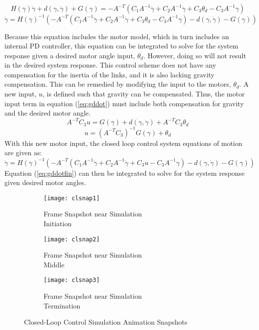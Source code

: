 \[
H(\gamma) \ddot{\gamma}+d(\gamma, \dot{\gamma})+G(\gamma)=-A^{-T}\left(C_1A^{-1} \ddot{\gamma}+C_2 A^{-1} \dot{\gamma}+C_3 \theta_{d}- C_3A^{-1} \gamma\right)
\]
\begin{equation}
\ddot{\gamma}=H(\gamma)^{-1}\left(-A^{-T}\left(C_1 A^{-1} \ddot{\gamma}+C_2 A^{-1} \dot{\gamma}+C_3 \theta_{d}-C_3A^{-1} \gamma\right)-d(\gamma, \dot{\gamma})-G(\gamma)\right)
\label{eq:gddot}
\end{equation}

Because this equation includes the motor model, which in turn includes an internal PD controller, this equation can be integrated to solve for the system response given a desired motor angle input, $\theta_d$. However, doing so will not result in the desired system response. This control scheme does not have any compensation for the inertia of the links, and it is also lacking gravity compensation. This can be remedied by modifying the input to the motors, $\theta_d$. A new input, $u$, is defined such that gravity can be compensated. Thus, the motor input term in equation (\ref{eq:gddot}) must include both compensation for gravity and the desired motor angle.
\[
A^{-T} C_3  u=G(\gamma)+d(\gamma, \dot{\gamma})+A^{-T} C_3\theta_{d}
\]
\begin{equation}
u=\left(A^{-T} C_3\right)^{-1} G(\gamma)+\theta_{d}
\end{equation}
With this new motor input, the closed loop control system equations of motion are given as:
\begin{equation}
\ddot{\gamma}=H(\gamma)^{-1}\left(-A^{-T}\left(C_1 A^{-1} \ddot{\gamma}+C_2 A^{-1} \dot{\gamma}+C_3 u-C_3A^{-1} \gamma\right)-d(\gamma, \dot{\gamma})-G(\gamma)\right)
\label{eq:gddotfin}
\end{equation}
Equation (\ref{eq:gddotfin}) can then be integrated to solve for the system response given desired motor angles.

\begin{figure}[htp]
  \center
  \begin{subfigure}[c]{0.33\textwidth}
    \center
    \texttt{[image: clsnap1]}
    \caption{Frame Snapshot near Simulation \\Initiation}
  \end{subfigure}%
  \begin{subfigure}[c]{0.33\textwidth}
    \center
    \texttt{[image: clsnap2]}
    \caption{Frame Snapshot near Simulation \\Middle}
  \end{subfigure}%
\begin{subfigure}[c]{0.33\textwidth}
  \center
  \texttt{[image: clsnap3]}
  \caption{Frame Snapshot near Simulation \\Termination}
\end{subfigure}
  \caption{Closed-Loop Control Simulation Animation Snapshots}
  \label{fig:clsnaps}
\end{figure}

